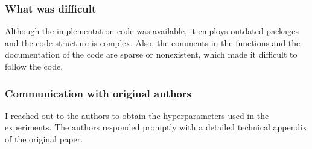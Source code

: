 \subsubsection*{What was difficult}
Although the implementation code was available, it employs outdated packages and the code structure is complex. Also, the comments in the functions and the documentation of the code are sparse or nonexistent, which made it difficult to follow the code.

\subsubsection*{Communication with original authors}
I reached out to the authors to obtain the hyperparameters used in the experiments. The authors responded promptly with a detailed technical appendix of the original paper.

